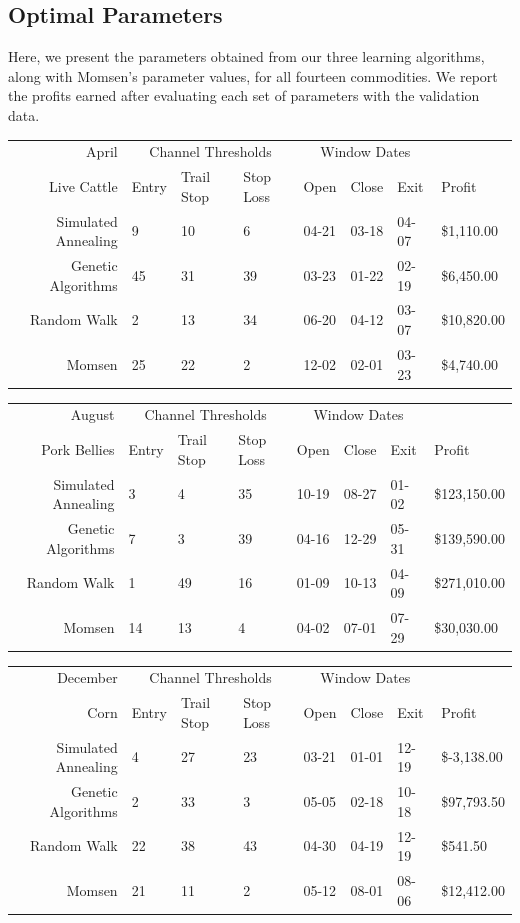 \documentclass[12pt]{article}
\begin{document}
\subsection{Optimal Parameters}

Here, we present the parameters obtained from our three learning algorithms,
along with Momsen's parameter values, for all fourteen commodities. We report
the profits earned after evaluating each set of parameters with the validation
data.

\begin{tabular}{|r|l|l|l|l|l|l|l|}
  \hline
  April & \multicolumn{3}{|c|}{Channel Thresholds} & \multicolumn{3}{|c|}{Window Dates} &  \\
  Live Cattle & Entry & Trail Stop & Stop Loss & Open & Close & Exit & Profit\\ \hline
  Simulated Annealing & 9 & 10 & 6 & 04-21 & 03-18 & 04-07 & \$1,110.00 \\ \hline
  Genetic Algorithms & 45 & 31 & 39 & 03-23 & 01-22 & 02-19 & \$6,450.00 \\ \hline
  Random Walk & 2 & 13 & 34 & 06-20 & 04-12 & 03-07 & \$10,820.00 \\ \hline
  Momsen & 25 & 22 & 2 & 12-02 & 02-01 & 03-23 & \$4,740.00 \\ \hline
\end{tabular}

\begin{tabular}{|r|l|l|l|l|l|l|l|}
  \hline
  August & \multicolumn{3}{|c|}{Channel Thresholds} & \multicolumn{3}{|c|}{Window Dates} &  \\
  Pork Bellies & Entry & Trail Stop & Stop Loss & Open & Close & Exit & Profit\\ \hline
  Simulated Annealing & 3 & 4 & 35 & 10-19 & 08-27 & 01-02 & \$123,150.00 \\ \hline
  Genetic Algorithms & 7 & 3 & 39 & 04-16 & 12-29 & 05-31 & \$139,590.00 \\ \hline
  Random Walk & 1 & 49 & 16 & 01-09 & 10-13 & 04-09 & \$271,010.00 \\ \hline
  Momsen &  14 & 13 & 4 & 04-02 & 07-01 & 07-29 & \$30,030.00 \\ \hline
\end{tabular}

\begin{tabular}{|r|l|l|l|l|l|l|l|}
  \hline
  December & \multicolumn{3}{|c|}{Channel Thresholds} & \multicolumn{3}{|c|}{Window Dates} &  \\
  Corn & Entry & Trail Stop & Stop Loss & Open & Close & Exit & Profit\\ \hline
  Simulated Annealing & 4 & 27 & 23 & 03-21 & 01-01 & 12-19 & \$-3,138.00 \\ \hline
  Genetic Algorithms & 2 & 33 & 3 & 05-05 & 02-18 & 10-18 & \$97,793.50 \\ \hline
  Random Walk & 22 & 38 & 43 & 04-30 & 04-19 & 12-19 & \$541.50 \\ \hline
  Momsen & 21 & 11 & 2 & 05-12 & 08-01 & 08-06 & \$12,412.00 \\ \hline
\end{tabular}
\end{document}

